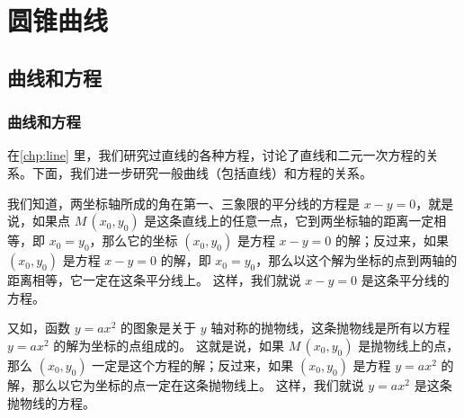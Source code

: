 \chapter{圆锥曲线}
\section{曲线和方程}
\subsection{曲线和方程}\label{subsec:curve_equation}
在\cref{chp:line} 里，我们研究过直线的各种方程，讨论了直线和二元一次方程的关系。下面，我们进一步研究一般曲线（包括直线）和方程的关系。

我们知道，两坐标轴所成的角在第一、三象限的平分线的方程是 $x-y= 0$，就是说，如果点 $M\,(x_0,y_0)$ 是这条直线上的任意一点，它到两坐标轴的距离一定相等，即 $x_0=y_0$，那么它的坐标 $(x_0,y_0)$ 是方程 $x-y=0$ 的解；反过来，如果 $(x_0,y_0)$ 是方程 $x-y=0$ 的解，即 $x_0=y_0$，那么以这个解为坐标的点到两轴的距离相等，它一定在这条平分线上。
这样，我们就说 $x-y=0$ 是这条平分线的方程。

又如，函数 $y=ax^2$ 的图象是关于 $y$ 轴对称的抛物线，这条抛物线是所有以方程 $y=ax^2$ 的解为坐标的点组成的。
这就是说，如果 $M\,(x_0,y_0)$ 是抛物线上的点，那么 $(x_0,y_0)$ 一定是这个方程的解；反过来，如果 $(x_0,y_0)$ 是方程 $y=ax^2$ 的解，那么以它为坐标的点一定在这条抛物线上。
这样，我们就说 $y=ax^2$ 是这条抛物线的方程。

